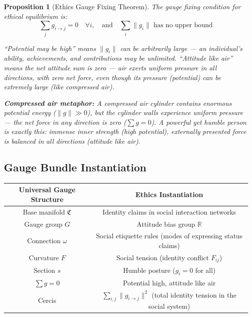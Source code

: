 \documentclass[12pt,a4paper]{article}
\theoremstyle{plain}
\newtheorem{proposition}[theorem]{Proposition}
\theoremstyle{definition}
\newcommand{\R}{\mathbb{R}}
\newcommand{\curv}{F}
\newcommand{\conn}{\omega}
\newcommand{\ClaimSpace}{\mathfrak{C}}
\begin{document}
\begin{proposition}[Ethics Gauge Fixing Theorem]
The gauge fixing condition for ethical equilibrium is:
\begin{equation}
    \sum_{j} g_{i \to j} = 0 \quad \forall i, \quad \text{and} \quad \sum_i \|g_i\| \text{ has no upper bound}
\end{equation}

``Potential may be high'' means $\|g_i\|$ can be arbitrarily large — an individual's ability, achievements, and contributions may be unlimited.
``Attitude like air'' means the net attitude sum is zero — air exerts uniform pressure in all directions, with zero net force,
even though its pressure (potential) can be extremely large (like compressed air).

\textbf{Compressed air metaphor:} A compressed air cylinder contains enormous potential energy ($\|g\| \gg 0$),
but the cylinder walls experience uniform pressure — the net force in any direction is zero ($\sum g = 0$).
A powerful yet humble person is exactly this: immense inner strength (high potential),
externally presented force is balanced in all directions (attitude like air).
\end{proposition}

\subsection{Gauge Bundle Instantiation}

\begin{center}
\begin{tabular}{c|c}
    \toprule
    \textbf{Universal Gauge Structure} & \textbf{Ethics Instantiation} \\
    \midrule
    Base manifold $\ClaimSpace$ & Identity claims in social interaction networks \\
    Gauge group $G$ & Attitude bias group $\R$ \\
    Connection $\conn$ & Social etiquette rules (modes of expressing status claims) \\
    Curvature $\curv$ & Social tension (identity conflict $F_{ij}$) \\
    Section $s$ & Humble posture ($g_i=0$ for all) \\
    $\sum g = 0$ & Potential high, attitude like air \\
    Cercis & $\sum_{i,j} \|g_{i \to j}\|^2$ (total identity tension in the social system) \\
    \bottomrule
\end{tabular}
\end{center}
\end{document}
